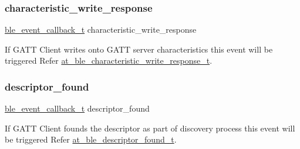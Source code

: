 \mbox{\label{structble__gatt__client__event__cb_a56ba53f48eabaee0c1e0112761650f31}} 
\subsubsection{\texorpdfstring{characteristic\_write\_response}{characteristic\_write\_response}}
{\footnotesize\ttfamily \mbox{\hyperlink{ble__manager_8h_a04ce4bb8cb8282f2762e3924b1773cc9}{ble\+\_\+event\+\_\+callback\+\_\+t}} characteristic\+\_\+write\+\_\+response}



If G\+A\+TT Client writes onto G\+A\+TT server characteristics this event will be triggered Refer \mbox{\hyperlink{structat__ble__characteristic__write__response__t}{at\+\_\+ble\+\_\+characteristic\+\_\+write\+\_\+response\+\_\+t}}. 

\mbox{\label{structble__gatt__client__event__cb_ae157e3403e4de753657b55d39bb08277}} 
\subsubsection{\texorpdfstring{descriptor\_found}{descriptor\_found}}
{\footnotesize\ttfamily \mbox{\hyperlink{ble__manager_8h_a04ce4bb8cb8282f2762e3924b1773cc9}{ble\+\_\+event\+\_\+callback\+\_\+t}} descriptor\+\_\+found}



If G\+A\+TT Client founds the descriptor as part of discovery process this event will be triggered Refer \mbox{\hyperlink{structat__ble__descriptor__found__t}{at\+\_\+ble\+\_\+descriptor\+\_\+found\+\_\+t}}. 

\mbox{\label{structble__gatt__client__event__cb_a849ea337025d6a2fabe329864aa7f3aa}} 
